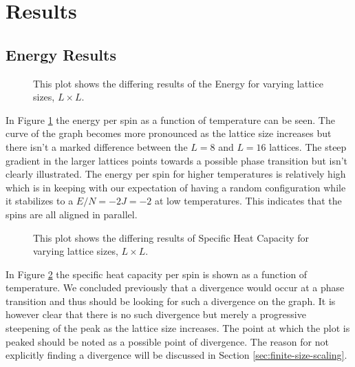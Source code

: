 \documentclass[a4paper]{article}
\begin{document}

\section{Results}

\subsection{Energy Results}\label{sec:energy-results}

\begin{figure}[htb]
  \centering %
  \caption[hjsagh]{This plot shows the differing results of the Energy 
    for varying lattice
    sizes, $L\times L$.}\label{fig:EvsT}
\end{figure}
In Figure \ref{fig:EvsT} the energy per spin as a function of temperature can be
seen. The curve of the graph becomes more pronounced as the lattice
size increases but there isn't a marked difference between the $L=8$ and
$L=16$ lattices. The steep gradient in the larger lattices points
towards a possible phase transition but isn't
clearly illustrated. The energy per spin for higher temperatures is
relatively high
which is in keeping with our expectation of having a random
configuration while it stabilizes to a $E/N=-2J=-2$ at low
temperatures. This indicates that the spins are all aligned in
parallel. %

\begin{figure}[H]
  \centering
  \caption[sffs]{This plot shows the differing results of Specific
    Heat Capacity for varying lattice
    sizes, $L\times L$.}\label{fig:CvsT}
\end{figure}
In Figure \ref{fig:CvsT} the specific heat capacity per spin is shown as a
function of temperature. We concluded previously that a divergence
would occur at a phase transition and thus should be looking for such
a divergence on the graph. It is however clear that there is no such
divergence but merely a progressive steepening of the peak as the
lattice size increases. The point at which the plot is peaked should be
noted as a possible point of divergence. The reason for not explicitly 
finding a divergence will be discussed in Section \ref{sec:finite-size-scaling}.
\end{document}
